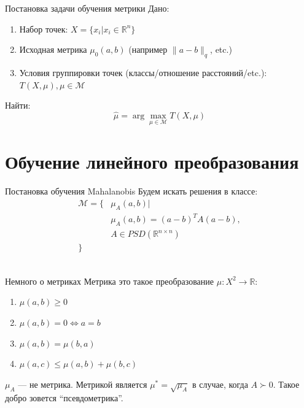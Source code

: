 \documentclass[14pt, fleqn, xcolor={dvipsnames, table}]{beamer}
\begin{document}
\begin{frame}{Постановка задачи обучения метрики}{}
{\color{blue}Дано:}
\begin{enumerate}
  \item Набор точек: $X = \{x_i | x_i \in \mathbb{R}^n\}$
  \item Исходная метрика $\mu_0(a,b)$ (например $\|a - b\|_q$, etc.)
  \item Условия группировки точек (классы/отношение расстояний/etc.): $T(X, \mu), \mu \in \mathcal{M}$
\end{enumerate}
{\color{blue}Найти:}\\
$$
\hat{\mu} = \arg \max_{\mu \in \mathcal{M}} T(X, \mu)
$$
\end{frame}

\section{Обучение линейного преобразования}

\begin{frame}{Постановка обучения Mahalanobis}{}
Будем искать решения в классе:
$$\begin{array}{ll}
\mathcal{M} = \{&\mu_A(a,b) | \\
& \mu_A(a,b) = (a - b)^T A (a - b), \\
& A \in PSD(\mathbb{R}^{n \times n})\\
\} &
\end{array}$$
\\
\end{frame}

\begin{frame}{Немного о метриках}{}
\small
Метрика это такое преобразование $\mu : X^2 \to \mathbb{R}$:
\begin{enumerate}
  \item $\mu(a,b) \ge 0$
  \item $\mu(a,b) = 0 \Leftrightarrow a = b$
  \item $\mu(a,b) = \mu(b,a)$
  \item $\mu(a,c) \le \mu(a,b) + \mu(b,c)$
\end{enumerate}
$\mu_A$ --- не метрика. Метрикой является $\mu^{*} = \sqrt{\mu_A}$ в случае, когда $A \succ 0$. Такое добро зовется ``псевдометрика''.
\end{frame}
\end{document}

